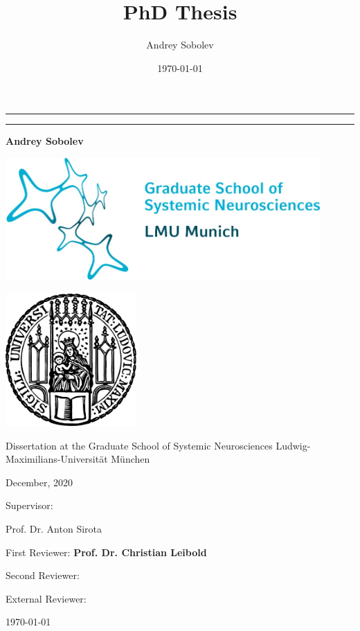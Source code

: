 \documentclass[twoside, 12pt,  footinclude=true, headinclude=true, cleardoublepage=empty]{scrbook}
\title{PhD Thesis}
\author{Andrey Sobolev}
\date{\today}
\begin{document}
\begin{titlepage}
	\centering


    \noindent\rule{15cm}{0.4pt}
    {\linespread{1.5}{\Huge Contribution of the idiothetic and the allothetic information to the hippocampal place code\par}}
    \noindent\rule{15cm}{0.4pt}

	{\LARGE \bfseries Andrey Sobolev}

    \includegraphics[width=120mm]{assets/gsn.jpg}

    \includegraphics[width=50mm]{assets/lmu-logo.png}

    Dissertation at the
    Graduate School of Systemic Neurosciences
		Ludwig-Maximilians-Universität München

    December, 2020

    \vfill

	\begin{flushleft}
	{\large Supervisor:}

	{\LARGE Prof. Dr. Anton Sirota\par}

	\vspace{1in}

	{\large First Reviewer:   \bfseries Prof. Dr. Christian Leibold\par}
	{\large Second Reviewer:\par}
	{\large External Reviewer:\par}

    \vspace{1in}
	{\large \today\par}
	\end{flushleft}

\end{titlepage}
\end{document}
